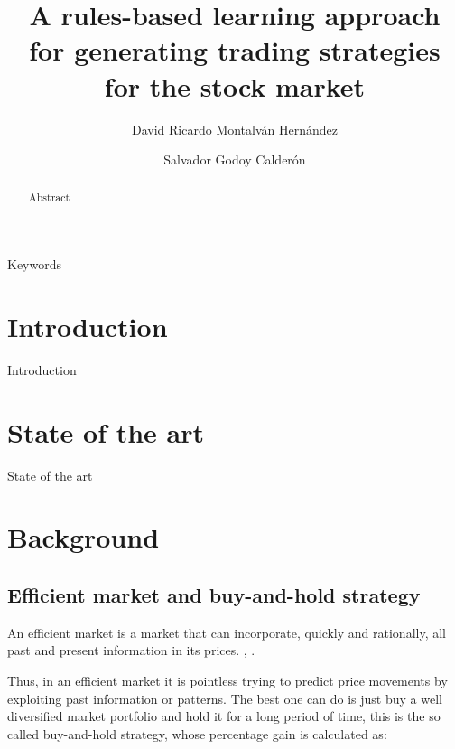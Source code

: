 \documentclass[preprint,3p,twocolumn]{elsarticle}
\begin{document}
\begin{frontmatter}
  \title{A rules-based learning approach for generating trading strategies for the stock market}
  
  \author[1]{David Ricardo Montalván Hernández }
  
  \author[1]{Salvador Godoy Calderón}
  
  \address[1]{Centro de Investigación en Computación, Instituto Politécnico Nacional,
  Av. Juan de Dios Bátiz e/ M.O. de Mendizábal s/n, Nva Ind. Vallejo, 07738, Mexico City, Mexico}
  
  
  \begin{abstract}
  Abstract
  \end{abstract}
  
  \begin{keyword}
  Keywords
  \end{keyword}
  
\end{frontmatter}

\section{Introduction}
\label{sec:introduction}
Introduction

\section{State of the art}
\label{sec:state of the art}
State of the art

\section{Background}
\label{sec:background}

\subsection{Efficient market and buy-and-hold strategy}
\label{subsec: efficient market}
An efficient market is a market that can incorporate, quickly and rationally, all past and present information in its prices. \cite{Fama1965}, \cite{CFA2019}.

Thus, in an efficient market it is pointless trying to predict price movements by exploiting past information or patterns. The best one can do is just buy a well diversified market portfolio and hold it for a long period of time, this is the so called buy-and-hold strategy, whose percentage gain is calculated as:
\end{document}
